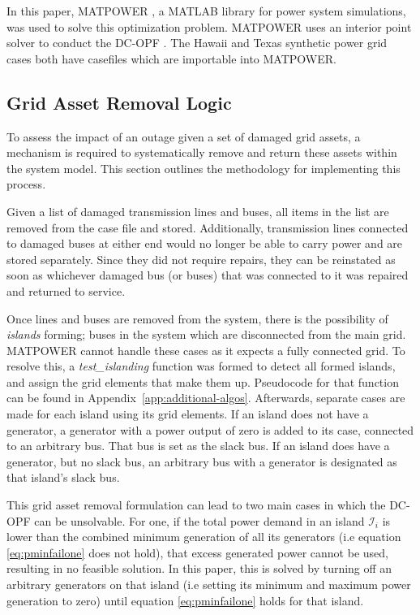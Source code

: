 \documentclass[12pt]{article}
\begin{document}
In this paper, MATPOWER \cite{zimmerman}, a MATLAB library for power system simulations, was used to solve this optimization problem. MATPOWER uses an interior point solver to conduct the DC-OPF \cite{zimmerman}. The Hawaii and Texas synthetic power grid cases both have casefiles which are importable into MATPOWER. \par

\subsection{Grid Asset Removal Logic}
To assess the impact of an outage given a set of damaged grid assets, a mechanism is required to systematically remove and return these assets within the system model. This section outlines the methodology for implementing this process. \par
Given a list of damaged transmission lines and buses, all items in the list are removed from the case file and stored. Additionally, transmission lines connected to damaged buses at either end would no longer be able to carry power and are stored separately. Since they did not require repairs, they can be reinstated as soon as whichever damaged bus (or buses) that was connected to it was repaired and returned to service. \par
Once lines and buses are removed from the system, there is the possibility of \textit{islands} forming; buses in the system which are disconnected from the main grid. MATPOWER cannot handle these cases as it expects a fully connected grid. To resolve this, a \textit{test\_islanding} function was formed to detect all formed islands, and assign the grid elements that make them up. Pseudocode for that function can be found in Appendix~\ref{app:additional-algos}. Afterwards, separate cases are made for each island using its grid elements. If an island does not have a generator, a generator with a power output of zero is added to its case, connected to an arbitrary bus. That bus is set as the slack bus. If an island does have a generator, but no slack bus, an arbitrary bus with a generator is designated as that island's slack bus. \par
This grid asset removal formulation can lead to two main cases in which the DC-OPF can be unsolvable. For one, if the total power demand in an island $\mathcal{I}_i$ is lower than the combined minimum generation of all its generators (i.e equation \eqref{eq:pminfailone} does not hold), that excess generated power cannot be used, resulting in no feasible solution. In this paper, this is solved by turning off an arbitrary generators on that island (i.e setting its minimum and maximum power generation to zero) until equation \eqref{eq:pminfailone} holds for that island. 
\end{document}
